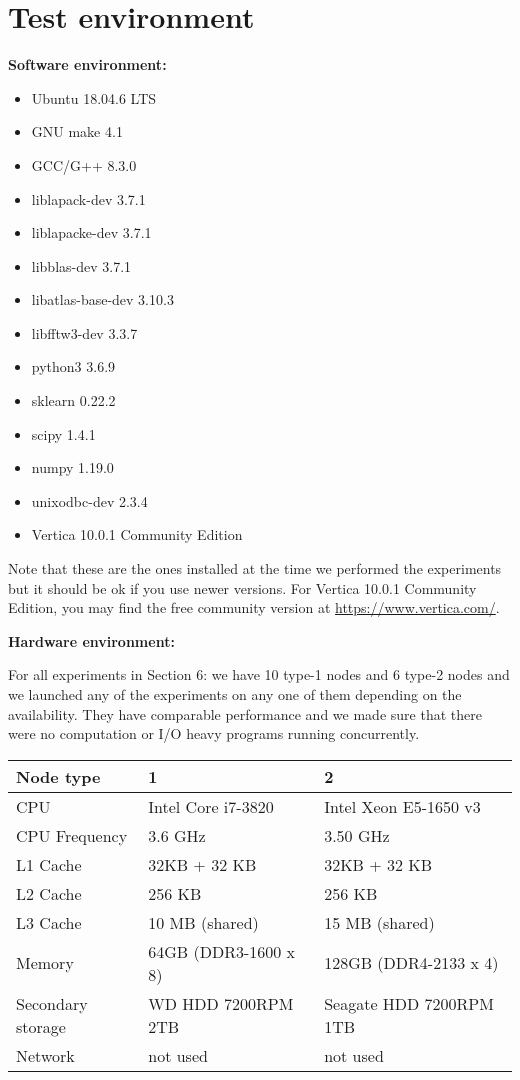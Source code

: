 \documentclass[11pt]{article}
\newenvironment{pkl}{%
\begin{itemize}%
\setlength\itemsep{-0.5\parskip}%
\setlength\parsep{0in}%
}{%
\end{itemize}}
\begin{document}
\section{Test environment}
{\bf Software environment:}
\begin{pkl}
	\item Ubuntu 18.04.6 LTS
    \item GNU make 4.1
	\item GCC/G++ 8.3.0
	\item liblapack-dev 3.7.1
	\item liblapacke-dev 3.7.1
	\item libblas-dev 3.7.1
	\item libatlas-base-dev 3.10.3
	\item libfftw3-dev 3.3.7
    \item python3 3.6.9
    \item sklearn 0.22.2
    \item scipy 1.4.1
    \item numpy 1.19.0
    \item unixodbc-dev 2.3.4
    \item Vertica 10.0.1 Community Edition
\end{pkl}
Note that these are the ones installed at the time we performed the
experiments but it should be ok if you use newer versions. For Vertica
10.0.1 Community Edition, you may find the free community version at
\url{https://www.vertica.com/}.

{\bf Hardware environment:}


For all experiments in Section 6: we have 10 type-1 nodes and 6 type-2
nodes and we launched any of the experiments on any one of them
depending on the availability. They have comparable performance and we
made sure that there were no computation or I/O heavy programs running
concurrently.

\vspace{1mm}
\begin{tabular}{|l|l|l|}
	\hline
	Node type &  1 & 2 \\\hline
	CPU & Intel Core i7-3820 & Intel Xeon E5-1650 v3 \\\hline
	CPU Frequency & 3.6 GHz & 3.50 GHz \\\hline
	L1 Cache & 32KB + 32 KB & 32KB + 32 KB\\\hline
	L2 Cache & 256 KB & 256 KB\\\hline
	L3 Cache & 10 MB (shared) & 15 MB (shared) \\\hline
	Memory & 64GB (DDR3-1600 x 8) & 128GB (DDR4-2133 x 4) \\\hline
	Secondary storage & WD HDD 7200RPM 2TB & Seagate HDD 7200RPM 1TB
	\\\hline
	Network & not used & not used \\\hline
\end{tabular}
\vspace{1mm}
\end{document}
